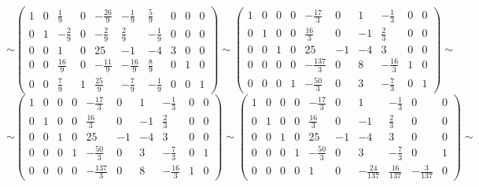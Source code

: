 \documentclass{article}
\begin{document}
\begin{equation*}
\sim
\left(\begin{array}{ccccc|cccccc}  
 1 & 0 & \frac{1}{9} & 0 & -\frac{26}{9} & -\frac{1}{9} & \frac{5}{9} & 0 & 0 & 0\\ 
 0 & 1 & -\frac{2}{9} & 0 & -\frac{2}{9} & \frac{2}{9} & -\frac{1}{9} & 0 & 0 & 0 \\
 0 & 0 & 1 & 0 & 25 & -1 & -4 & 3 & 0 & 0\\
 0 & 0 & \frac{16}{9} & 0 & -\frac{11}{9} & -\frac{16}{9} & \frac{8}{9} & 0 & 1 & 0\\
 0 & 0 & \frac{7}{9} & 1 & \frac{25}{9} & -\frac{7}{9} & -\frac{1}{9} & 0 & 0 & 1
\end{array}\right) 
\sim
\left(\begin{array}{ccccc|cccccc}  
 1 & 0 & 0 & 0 & -\frac{17}{3} & 0 & 1 & -\frac{1}{3} & 0 & 0\\ 
 0 & 1 & 0 & 0 & \frac{16}{3} & 0 & -1 & \frac{2}{3} & 0 & 0 \\
 0 & 0 & 1 & 0 & 25 & -1 & -4 & 3 & 0 & 0\\
 0 & 0 & 0 & 0 & -\frac{137}{3} & 0 & 8 & -\frac{16}{3} & 1 & 0\\
 0 & 0 & 0 & 1 & -\frac{50}{3} & 0 & 3 & -\frac{7}{3} & 0 & 1
\end{array}\right) 
\sim
\end{equation*}
\begin{equation*}
\sim
\left(\begin{array}{ccccc|cccccc}  
 1 & 0 & 0 & 0 & -\frac{17}{3} & 0 & 1 & -\frac{1}{3} & 0 & 0\\ 
 0 & 1 & 0 & 0 & \frac{16}{3} & 0 & -1 & \frac{2}{3} & 0 & 0 \\
 0 & 0 & 1 & 0 & 25 & -1 & -4 & 3 & 0 & 0\\
 0 & 0 & 0 & 1 & -\frac{50}{3} & 0 & 3 & -\frac{7}{3} & 0 & 1\\
 0 & 0 & 0 & 0 & -\frac{137}{3} & 0 & 8 & -\frac{16}{3} & 1 & 0
\end{array}\right) 
\sim
\left(\begin{array}{ccccc|cccccc}  
 1 & 0 & 0 & 0 & -\frac{17}{3} & 0 & 1 & -\frac{1}{3} & 0 & 0\\ 
 0 & 1 & 0 & 0 & \frac{16}{3} & 0 & -1 & \frac{2}{3} & 0 & 0 \\
 0 & 0 & 1 & 0 & 25 & -1 & -4 & 3 & 0 & 0\\
 0 & 0 & 0 & 1 & -\frac{50}{3} & 0 & 3 & -\frac{7}{3} & 0 & 1\\
 0 & 0 & 0 & 0 & 1 & 0 & -\frac{24}{137} & \frac{16}{137} & -\frac{3}{137} & 0
\end{array}\right) 
\sim
\end{equation*}
\end{document}
